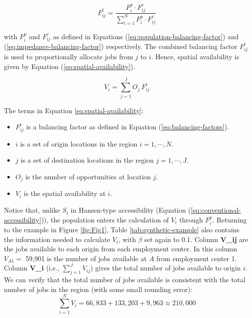 \documentclass[10pt,letterpaper]{article}
\providecommand{\tightlist}{%
  \setlength{\itemsep}{0pt}\setlength{\parskip}{0pt}}
\begin{document}
\begin{equation}
\label{eq:balancing-factors}
F^t_{ij} = \frac{F^p_{i} \cdot F^c_{ij}}{\sum_{i=1}^N F^p_{i} \cdot F^c_{ij}}
\end{equation}

\noindent with \(F^p_{i}\) and \(F^c_{ij}\) as defined in Equations
(\ref{eq:population-balancing-factor}) and
(\ref{eq:impedance-balancing-factor}) respectively. The combined
balancing factor \(F^t_{ij}\) is used to proportionally allocate jobs
from \(j\) to \(i\). Hence, spatial availability is given by Equation
(\ref{eq:spatial-availability}).

\begin{equation}
\label{eq:spatial-availability}
V_{i} = \sum_{j=1}^J O_j\ F^t_{ij}
\end{equation}

The terms in Equation \ref{eq:spatial-availability}:

\begin{itemize}
\tightlist
\item
  \(F^t_{ij}\) is a balancing factor as defined in Equation
  (\ref{eq:balancing-factors}).
\item
  \(i\) is a set of origin locations in the region \(i = 1,\cdots, N\).
\item
  \(j\) is a set of destination locations in the region
  \(j = 1,\cdots,J\).
\item
  \(O_j\) is the number of opportunities at location \(j\).
\item
  \(V_{i}\) is the spatial availability at \(i\).
\end{itemize}

Notice that, unlike \(S_i\) in Hansen-type accessibility (Equation
(\ref{eq:conventional-accessibility})), the population enters the
calculation of \(V_{i}\) through \(F^p_i\). Returning to the example in
Figure \ref{fig:Fig1}, Table \ref{tab:synthetic-example} also contains
the information needed to calculate \(V_i\), with \(\beta\) set again to
0.1. Column \textbf{V\_ij} are the jobs available to each origin from
each employment center. In this column \(V_{A1}=\) 59,901 is the number
of jobs available at \(A\) from employment center 1. Column
\textbf{V\_i} (i.e., \(\sum_{j=1}^JV_{ij}\)) gives the total number of
jobs available to origin \(i\). We can verify that the total number of
jobs available is consistent with the total number of jobs in the region
(with some small rounding error): \[
\sum_{i=1}^N V_i = 66,833 + 133,203 + 9,963 \approx 210,000 
\]
\end{document}
